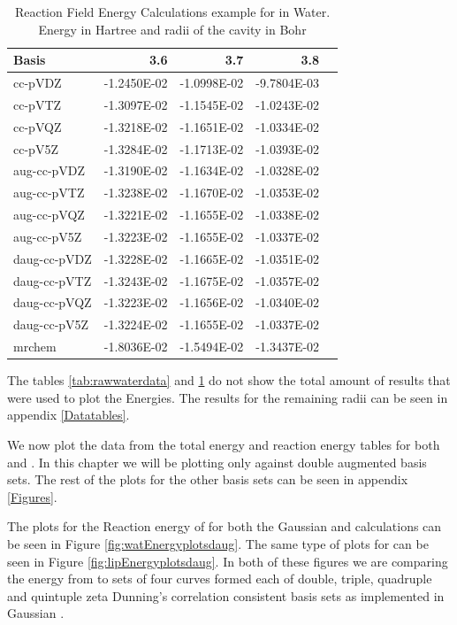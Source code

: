 \documentclass[../master_thesis.tex]{subfiles}
\begin{document}
\begin{table}[!htbp]
\caption[$E_r$ for  in Water sample]{Reaction Field Energy Calculations example for  in Water. Energy in Hartree and radii of the cavity in Bohr}
\begin{center}
\begin{tabular}{l|r|r|r|r}
Basis & 3.6 & 3.7 & 3.8 \\\hline
cc-pVDZ & -1.2450E-02 & -1.0998E-02 & -9.7804E-03 \\
cc-pVTZ & -1.3097E-02 & -1.1545E-02 & -1.0243E-02 \\
cc-pVQZ & -1.3218E-02 & -1.1651E-02 & -1.0334E-02 \\
cc-pV5Z & -1.3284E-02 & -1.1713E-02 & -1.0393E-02 \\\hline
aug-cc-pVDZ & -1.3190E-02 & -1.1634E-02 & -1.0328E-02 \\
aug-cc-pVTZ & -1.3238E-02 & -1.1670E-02 & -1.0353E-02 \\
aug-cc-pVQZ & -1.3221E-02 & -1.1655E-02 & -1.0338E-02 \\
aug-cc-pV5Z & -1.3223E-02 & -1.1655E-02 & -1.0337E-02 \\\hline
daug-cc-pVDZ & -1.3228E-02 & -1.1665E-02 & -1.0351E-02 \\
daug-cc-pVTZ & -1.3243E-02 & -1.1675E-02 & -1.0357E-02 \\
daug-cc-pVQZ & -1.3223E-02 & -1.1656E-02 & -1.0340E-02 \\
daug-cc-pV5Z & -1.3224E-02 & -1.1655E-02 & -1.0337E-02 \\\hline
mrchem & -1.8036E-02 & -1.5494E-02 & -1.3437E-02 \\
\end{tabular}
\end{center}
\label{tab:Erwatdata}
\end{table}
 The tables \ref{tab:rawwaterdata} and \ref{tab:Erwatdata} do not show the total
 amount of results that were used to plot the Energies. The results for the remaining
 radii can be seen in appendix \ref{Datatables}.

We now plot the data from the total energy and reaction energy tables for
both  and . In this chapter we will be plotting only against
double augmented basis sets. The rest of the plots for the other basis sets can
be seen in appendix \ref{Figures}.

The plots for the Reaction energy of  for
both the Gaussian and  \mrchem calculations can be seen in Figure \ref{fig:watEnergyplotsdaug}.
The same type of plots for  can be seen in Figure \ref{fig:lipEnergyplotsdaug}.
In both of these figures we are comparing the energy from \mrchem to sets of four
curves formed each of double, triple, quadruple and quintuple zeta Dunning's correlation
consistent basis sets\cite{doi:10.1063/1.456153} as implemented in Gaussian \cite{G09}.
\end{document}
